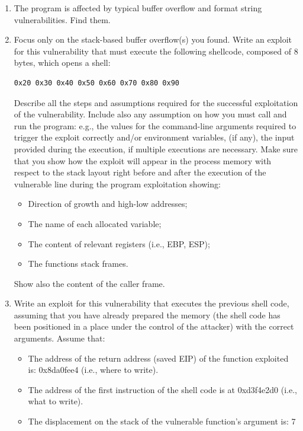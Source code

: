 \begin{enumerate}
    \item The program is affected by typical buffer overflow and format string vulnerabilities.
        Find them.
    \item Focus only on the stack-based buffer overflow(s) you found. 
        Write an exploit for this vulnerability that must execute the following shellcode, composed of 8 bytes, which opens a shell:
\begin{verbatim}
0x20 0x30 0x40 0x50 0x60 0x70 0x80 0x90
\end{verbatim}
        Describe all the steps and assumptions required for the successful exploitation of the vulnerability.
        Include also any assumption on how you must call and run the program: e.g., the values for the command-line arguments required to trigger the exploit correctly and/or environment variables, (if any), the input provided during the execution, if multiple executions are necessary.
        Make sure that you show how the exploit will appear in the process memory with respect to the stack layout right before and after the execution of the vulnerable line during the program exploitation showing:
        \begin{itemize}
            \item Direction of growth and high-low addresses;
            \item  The name of each allocated variable;
            \item  The content of relevant registers (i.e., EBP, ESP);
            \item  The functions stack frames.
        \end{itemize} 
        Show also the content of the caller frame.
    \item Write an exploit for this vulnerability that executes the previous shell code, assuming that you have already prepared the memory (the shell code has been positioned in a place under the control of the attacker) with the correct arguments. 
        Assume that: 
        \begin{itemize}
            \item The address of the return address (saved EIP) of the function exploited is: 0x8da0fee4 (i.e., where to write). 
            \item The address of the first instruction of the shell code is at 0xd3f4e2d0 (i.e., what to write). 
            \item The displacement on the stack of the vulnerable function's argument is: 7

\end{itemize}
\end{enumerate}
